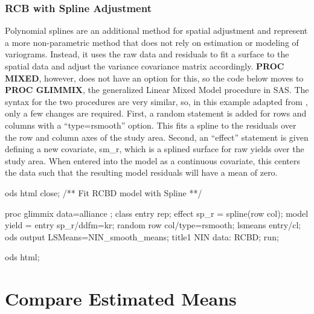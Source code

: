 \documentclass[
]{book}
\newenvironment{Shaded}{\begin{snugshade}}{\end{snugshade}}
\newcommand{\NormalTok}[1]{#1}
\begin{document}
\hypertarget{rcb-with-spline-adjustment}{%
\subsubsection{RCB with Spline Adjustment}\label{rcb-with-spline-adjustment}}

Polynomial splines are an additional method for spatial adjustment and represent a more non-parametric method that does not rely on estimation or modeling of variograms. Instead, it uses the raw data and residuals to fit a surface to the spatial data and adjust the variance covariance matrix accordingly. \textbf{PROC MIXED}, however, does not have an option for this, so the code below moves to \textbf{PROC GLIMMIX}, the generalized Linear Mixed Model procedure in SAS. The syntax for the two procedures are very similar, so, in this example adapted from \citep{stroup2013}, only a few changes are required. First, a random statement is added for rows and columns with a ``type=rsmooth'' option. This fits a spline to the residuals over the row and column axes of the study area. Second, an ``effect'' statement is given defining a new covariate, sm\_r, which is a splined surface for raw yields over the study area. When entered into the model as a continuous covariate, this centers the data such that the resulting model residuals will have a mean of zero.

\begin{Shaded}
\begin{Highlighting}[]

\NormalTok{ods html close;}
\NormalTok{/** Fit  RCBD model with Spline **/}

\NormalTok{proc glimmix data=alliance ;}
\NormalTok{    class entry rep;}
\NormalTok{    effect sp\_r = spline(row col);}
\NormalTok{    model yield = entry  sp\_r/ddfm=kr;}
\NormalTok{    random row col/type=rsmooth;}
\NormalTok{    lsmeans entry/cl;}
\NormalTok{    ods output LSMeans=NIN\_smooth\_means;}
\NormalTok{    title1 \textquotesingle{}NIN data: RCBD\textquotesingle{};}
\NormalTok{run;}

\NormalTok{ods html;}
\end{Highlighting}
\end{Shaded}

\hypertarget{compare-estimated-means}{%
\section{Compare Estimated Means}\label{compare-estimated-means}}
\end{document}
